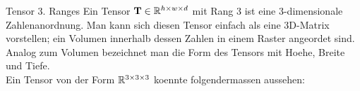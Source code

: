 \begin{defbox}{Tensor 3. Ranges}
  Ein Tensor $\mathbf{T} \in \mathbb{R}^{h \times w \times d}$ mit Rang 3 ist eine 3-dimensionale Zahlenanordnung. Man kann sich
  diesen Tensor einfach als eine 3D-Matrix vorstellen; ein Volumen innerhalb
  dessen Zahlen in einem Raster angeordet sind.
  Analog zum Volumen bezeichnet man die Form des Tensors mit Hoehe, Breite und
  Tiefe. \\
  Ein Tensor von der Form $\mathbb{R}^{3 \times 3 \times 3}$ koennte folgendermassen
  aussehen:
  \para{}




\end{defbox}
\newcommand{\arrayfilling}[2]{
  \fill[#2!30, opacity=.5] ([shift={(1mm,1mm)}]#1.north west) coordinate(#1auxnw)--([shift={(1mm,1mm)}]#1.north east)coordinate(#1auxne) to[out=-75, in=75] ([shift={(1mm,-1mm)}]#1.south east)coordinate(#1auxse)--([shift={(1mm,-1mm)}]#1.south west)coordinate(#1auxsw) to[out=105, in=-105] cycle;
  \fill[#2!80!black, opacity=1] (#1auxne) to[out=-75, in=75] (#1auxse) to[out=78, in=-78] cycle;
  \fill[#2!80!black, opacity=1] (#1auxnw) to[out=-105, in=105] (#1auxsw) to[out=102, in=-102] cycle;
}

